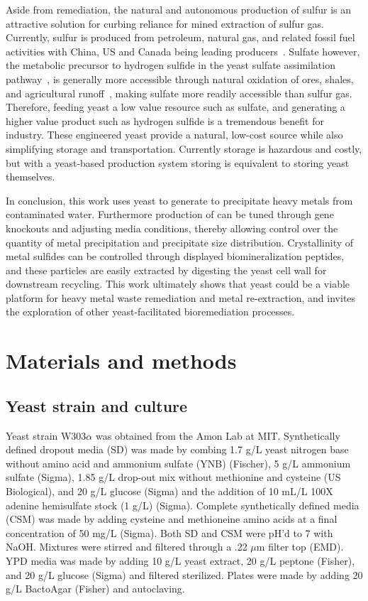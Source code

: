 \documentclass[../main/main]{subfiles}
\begin{document}
Aside from remediation, the natural and autonomous production of sulfur is an attractive solution for curbing reliance for mined extraction of sulfur gas. Currently, sulfur is produced from petroleum, natural gas, and related fossil fuel activities with China, US and Canada being leading producers~\cite{selim2013,usdepartmentoftheinterior2018}. Sulfate however, the metabolic precursor to hydrogen sulfide in the yeast sulfate assimilation pathway~\cite{swiegers2007,linderholm2008}, is generally more accessible through natural oxidation of ores, shales, and agricultural runoff~\cite{little2000}, making sulfate more readily accessible than sulfur gas. Therefore, feeding yeast a low value resource such as sulfate, and generating a higher value product such as hydrogen sulfide is a tremendous benefit for industry. These engineered yeast provide a natural, low-cost \HS{} source while also simplifying \HS{} storage and transportation.
Currently \HS{} storage is hazardous and costly, but with a yeast-based production system storing \HS{} is equivalent to storing yeast themselves.

In conclusion, this work uses yeast to generate \HS{} to precipitate heavy metals from contaminated water. Furthermore production of \HS{} can be tuned through gene knockouts and adjusting media conditions, thereby allowing control over the quantity of metal precipitation and precipitate size distribution. Crystallinity of metal sulfides can be controlled through displayed biomineralization peptides, and these particles are easily extracted by digesting the yeast cell wall for downstream recycling. This work ultimately shows that yeast could be a viable platform for heavy metal waste remediation and metal re-extraction, and invites the exploration of other yeast-facilitated bioremediation processes.

\section{Materials and methods}

\subsection*{Yeast strain and culture}
Yeast strain W303$\alpha$ was obtained from the Amon Lab at MIT. Synthetically defined dropout media (SD) was made by combing 1.7 g/L yeast nitrogen base without amino acid and ammonium sulfate (YNB) (Fischer), 5 g/L ammonium sulfate (Sigma), 1.85 g/L drop-out mix without methionine and cysteine (US Biological), and 20 g/L glucose (Sigma) and the addition of 10 mL/L 100X adenine hemisulfate stock (1 g/L) (Sigma). Complete synthetically defined media (CSM) was made by adding cysteine and methioneine amino acids at a final concentration of 50 mg/L (Sigma). Both SD and CSM were pH'd to 7 with NaOH. Mixtures were stirred and filtered through a .22 $\mu$m filter top (EMD). YPD media was made by adding 10 g/L yeast extract, 20 g/L peptone (Fisher), and 20 g/L glucose (Sigma) and filtered sterilized. Plates were made by adding 20 g/L BactoAgar (Fisher) and autoclaving.
\end{document}
